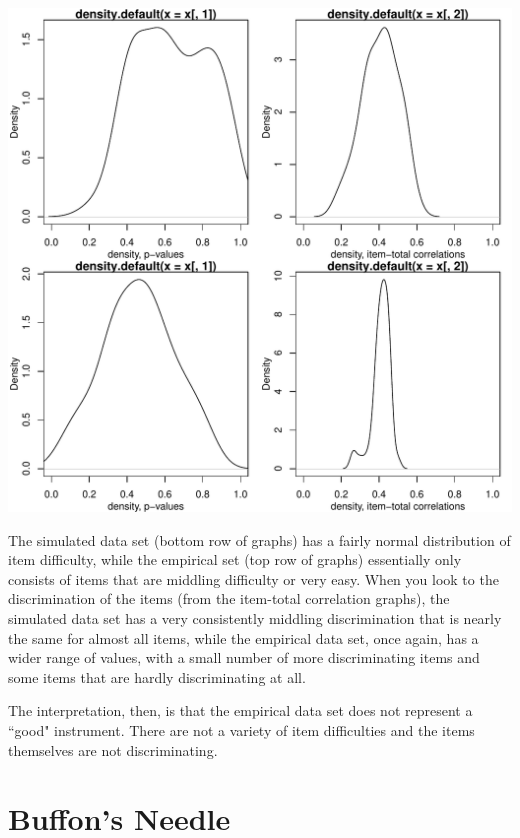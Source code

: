 \documentclass[letterpaper,12pt]{article}\usepackage[]{graphicx}\usepackage[]{color}
\makeatletter
\def\maxwidth{ %
  \ifdim\Gin@nat@width>\linewidth
    \linewidth
  \else
    \Gin@nat@width
  \fi
}
\newenvironment{knitrout}{}{} %
\numberwithin{equation}{section}
\makeatother
\begin{document}
\begin{knitrout}
\includegraphics[width=\maxwidth]{figure/unnamed-chunk-13-2} 

\end{knitrout}


The simulated data set (bottom row of graphs) has a fairly normal distribution of item difficulty, while the empirical set (top row of graphs) essentially only consists of items that are middling difficulty or very easy.  When you look to the discrimination of the items (from the item-total correlation graphs), the simulated data set has a very consistently middling discrimination that is nearly the same for almost all items, while the empirical data set, once again, has a wider range of values, with a small number of more discriminating items and some items that are hardly discriminating at all. 


The interpretation, then, is that the empirical data set does not represent a ``good" instrument.  There are not a variety of item difficulties and the items themselves are not discriminating.

\pagebreak
\section{Buffon's Needle}
\end{document}
